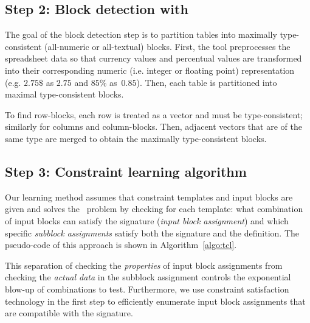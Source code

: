 \subsection{Step 2: Block detection with \ecblockdetect} \label{sec:make_groups}
The goal of the block detection step is to partition tables into maximally type-consistent (all-numeric or all-textual) blocks.
First, the \added{\ecblockdetect{}} tool preprocesses the spreadsheet data so that currency values and percentual values are transformed into their corresponding numeric (i.e. integer or floating point) representation (e.g. $2.75 \$$ as $2.75$ and $85\%$ as~$0.85$).
Then, each table is partitioned into maximal type-consistent blocks.

To find row-blocks, each row is treated as a vector and must be type-consistent; similarly for columns and column-blocks.
Then, adjacent vectors that are of the same type are merged to obtain the maximally type-consistent blocks.


\subsection{Step 3: Constraint learning algorithm}
\label{sec:algo}
Our learning method assumes that constraint templates and input blocks are given and solves the \tcl~problem by checking for each template: what combination of input blocks can satisfy the signature (\textit{input block assignment}) and which specific \textit{subblock assignments} satisfy both the signature and the definition.
The pseudo-code of this approach is shown in Algorithm~\ref{algo:tcl}.


This separation of checking the \textit{properties} of input block assignments from checking the \textit{actual data} in the subblock assignment controls the exponential blow-up of combinations to test. Furthermore, we use constraint satisfaction technology in the first step to efficiently enumerate input block assignments that are compatible with the signature. %

